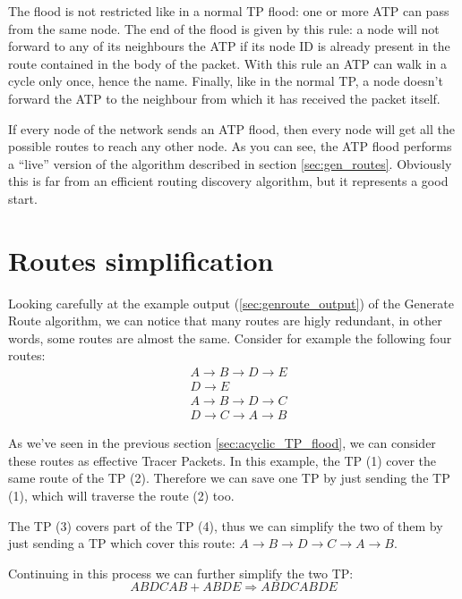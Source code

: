 \documentclass[a4paper]{article}
\begin{document}
The flood is not restricted like in a normal TP flood: one or more ATP can
pass from the same node. The end of the flood is given by this rule: a node
will not forward to any of its neighbours the ATP if its node ID is already present
in the route contained in the body of the packet. With this rule an ATP can
walk in a cycle only once, hence the name.
Finally, like in the normal TP, a node doesn't forward the ATP to the
neighbour from which it has received the packet itself.

If every node of the network sends an ATP flood, then every node will get
all the possible routes to reach any other node.
\newline
As you can see, the ATP flood performs a ``live'' version of the algorithm
described in section \ref{sec:gen_routes}.
Obviously this is far from an efficient routing discovery algorithm, but it
represents a good start.

\section{Routes simplification}
\label{sec:simplify_routes}

Looking carefully at the example output (\ref{sec:genroute_output}) of the
Generate Route algorithm, we can notice that many routes are higly redundant,
in other words, some routes are almost the same.
Consider for example the following four routes:
\begin{align}
	& A \rightarrow B \rightarrow D \rightarrow E \label{eq:e1}\\
	& D \rightarrow E \label{eq:e2} \\
	& A \rightarrow B \rightarrow D \rightarrow C \label{eq:e3}\\
	& D \rightarrow C \rightarrow A \rightarrow B \label{eq:e4}
\end{align}

As we've seen in the previous section \ref{sec:acyclic_TP_flood}, we can consider
these routes as effective Tracer Packets.
In this example, the TP (1) cover the same route of the TP
(2). Therefore we can save one TP by just sending the TP
(1), which will traverse the route (2) too.

The TP (3) covers part of the TP (4), thus we can simplify
the two of them by just sending a TP which cover this route: $A \rightarrow B
\rightarrow D \rightarrow C \rightarrow A \rightarrow B$.

Continuing in this process we can further simplify the two TP:
\[ ABDCAB + ABDE \Rightarrow  ABDCABDE \]
\end{document}
